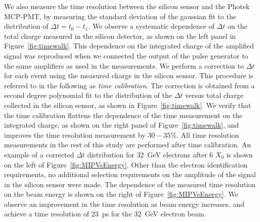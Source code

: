 \documentclass[preprint,1p]{elsarticle}
\begin{document}
We also measure the time resolution between the silicon sensor and the Photek
MCP-PMT, by measuring the standard deviation of the gaussian fit to the
distribution of $\Delta t = t_0-t_1$. We observe a systematic dependence of
$\Delta t$ on the total charge measured in the silicon detector, as shown on the
left panel in Figure~\ref{fig:timewalk}. This dependence on the integrated
charge of the amplified signal was reproduced when we connected the output of
the pulse generator to the same amplifiers as used in the measurements. We
perform a correction to $\Delta t$ for each event using the measured charge in
the silicon sensor. This procedure is referred to in the following as
\textit{time calibration}. The correction is obtained from a second degree
polynomial fit to the distribution of the $\Delta t$ versus total charge
collected in the silicon sensor, as shown in Figure~\ref{fig:timewalk}. We
verify that the time calibration flattens the dependence of the time measurement
on the integrated charge, as shown on the right panel of
Figure~\ref{fig:timewalk}, and improves the time resolution measurement by
$30-35$\%. All time resolution measurements in the rest of this study are
performed after time calibration. An example of a corrected $\Delta t$
distribution for $32$~GeV electrons after 6 $X_0$ is shown on the left of
Figure~\ref{fig:MIPVsEnergy}. Other than the electron
identification requirements, no additional selection requirements on the
amplitude of the signal in the silicon sensor were made. The dependence of the
measured time resolution on the beam energy is shown on the right of
Figure~\ref{fig:MIPVsEnergy}. We observe an improvement in the time resolution
as beam energy increases, and achieve a time resolution of $23$~ps for the
$32$~GeV electron beam.
\end{document}
